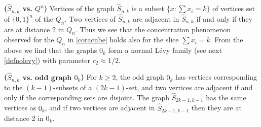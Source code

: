 \documentclass{article}
\newcommand{\bfs}[1]{\textbf{({#1})}}
\begin{document}
\begin{rema}{\bfs{$\hat{S}_{n, k}$ vs. $Q^n$}}
Vertices of the graph $\hat{S}_{n, k}$ is a subset $\{x:\sum x_{i}=k\}$ of vertices set of $\{0,1\}^{ n }$ of the  $Q _{ n } .$ Two vertices of $\hat{ S }_{ n , k }$ are adjacent in $\hat{ S }_{ n , k }$ if and only if they are at distance $2$ in $Q_{n} .$ Thus we see that the concentration phenomenon observed for the  $Q _{ n }$ in \cref{coracube} holds also for the slice $\sum x_{i}=k$. From the above we find that the graphs $0_{k}$ form a normal L\'{e}vy family (see next \cref{defnolevy}) with parameter $c_{2}\approx 1 / 2$.
\end{rema}
\begin{rema}{\bfs{$\hat{S}_{n, k}$ vs. odd graph $0_{ k }$}}
For $k \geq 2$, the odd graph $0_{ k }$ has vertices corresponding to the $( k -1)$-subsets of a $(2k-1)$-set, and two vertices are adjacent if and only if the corresponding sets are disjoint. The graph $\hat{ S }_{2 k -1, k -1}$ has the same vertices as
$0_{ k }$, and if two vertices are adjacent in $\hat{ S }_{2 k -1, k -1}$ then they are at distance 2 in $0_{ k }$.
\end{rema}
\end{document}
